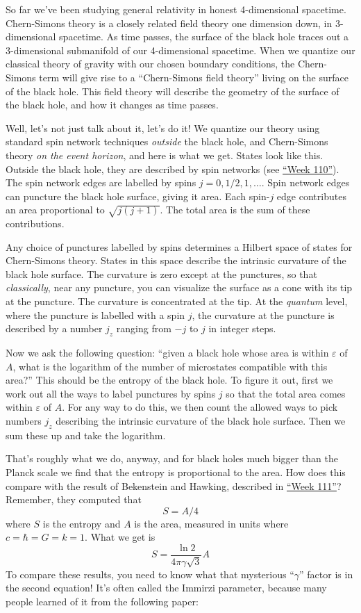 \documentclass{article}
\begin{document}
So far we've been studying general relativity in honest 4-dimensional
spacetime. Chern-Simons theory is a closely related field theory one
dimension down, in 3-dimensional spacetime. As time passes, the surface
of the black hole traces out a 3-dimensional submanifold of our
4-dimensional spacetime. When we quantize our classical theory of
gravity with our chosen boundary conditions, the Chern-Simons term will
give rise to a ``Chern-Simons field theory'' living on the surface of
the black hole. This field theory will describe the geometry of the
surface of the black hole, and how it changes as time passes.

Well, let's not just talk about it, let's do it! We quantize our theory
using standard spin network techniques \emph{outside} the black hole,
and Chern-Simons theory \emph{on the event horizon}, and here is what we
get. States look like this. Outside the black hole, they are described
by spin networks (see \protect\hyperlink{week110}{``Week 110''}). The
spin network edges are labelled by spins \(j = 0, 1/2, 1,\ldots\). Spin
network edges can puncture the black hole surface, giving it area. Each
spin-\(j\) edge contributes an area proportional to \(\sqrt{j(j+1)}\).
The total area is the sum of these contributions.

Any choice of punctures labelled by spins determines a Hilbert space of
states for Chern-Simons theory. States in this space describe the
intrinsic curvature of the black hole surface. The curvature is zero
except at the punctures, so that \emph{classically}, near any puncture,
you can visualize the surface as a cone with its tip at the puncture.
The curvature is concentrated at the tip. At the \emph{quantum} level,
where the puncture is labelled with a spin \(j\), the curvature at the
puncture is described by a number \(j_z\) ranging from \(-j\) to \(j\)
in integer steps.

Now we ask the following question: ``given a black hole whose area is
within \(\varepsilon\) of \(A\), what is the logarithm of the number of
microstates compatible with this area?'' This should be the entropy of
the black hole. To figure it out, first we work out all the ways to
label punctures by spins \(j\) so that the total area comes within
\(\varepsilon\) of \(A\). For any way to do this, we then count the
allowed ways to pick numbers \(j_z\) describing the intrinsic curvature
of the black hole surface. Then we sum these up and take the logarithm.

That's roughly what we do, anyway, and for black holes much bigger than
the Planck scale we find that the entropy is proportional to the area.
How does this compare with the result of Bekenstein and Hawking,
described in \protect\hyperlink{week111}{``Week 111''}? Remember, they
computed that \[S = A/4\] where \(S\) is the entropy and \(A\) is the
area, measured in units where \(c = \hbar = G = k = 1\). What we get is
\[S = \frac{\ln 2}{4\pi\gamma\sqrt{3}} A\] To compare these results, you
need to know what that mysterious ``\(\gamma\)'' factor is in the second
equation! It's often called the Immirzi parameter, because many people
learned of it from the following paper:
\end{document}
